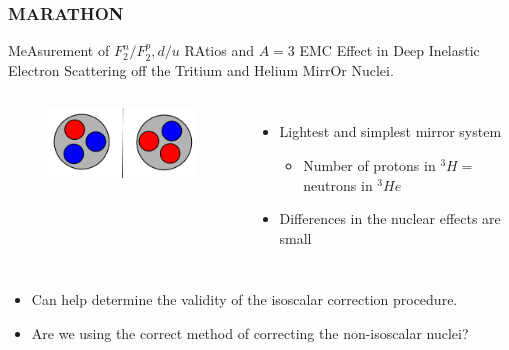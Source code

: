 \documentclass[12pt,usenames,dvipsnames]{beamer}
\begin{document}
\begin{frame}
\frametitle{MARATHON}
\vspace{-10pt}
\begin{block}{}
MeAsurement of $F^n_2/F^p_2, d/u$ RAtios and $A=3$ EMC Effect in Deep Inelastic Electron Scattering off the Tritium and Helium MirrOr Nuclei.
\vspace{-10pt}
\begin{columns}[t]
	
	\vspace{-10pt}	
	\hspace{-10pt}
	\begin{figure}
		\includegraphics[width =5cm]{../images/mirror}
	\end{figure}
	
	\vspace{10pt}
	\begin{itemize}
		\item Lightest and simplest mirror system
		\begin{itemize}
			\item  Number of protons in $^3H =$ neutrons in $^3He$
		\end{itemize}
		\item Differences in the nuclear effects are small
	\end{itemize}
	
	
\end{columns}
\begin{itemize}
	\item Can help determine the validity of the isoscalar correction procedure.
	\item Are we using the correct method of correcting the non-isoscalar nuclei?
\end{itemize}

\end{block}
\end{frame}
\end{document}
